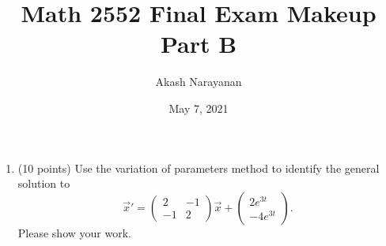 \documentclass[11pt, titlepage]{article}
\title{Math 2552 Final Exam Makeup Part B}
\author{Akash Narayanan}
\date{May 7, 2021}
\begin{document}
    \maketitle

    \begin{enumerate}
        \item (10 points) Use the variation of parameters method to identify the general solution to
        \[
        \vec{x}' =
        \begin{pmatrix}
            2 & -1 \\
            -1 & 2
        \end{pmatrix} \vec{x} +
        \begin{pmatrix}
            2e^{3t} \\
            -4e^{3t}
        \end{pmatrix}.
        \]
        Please show your work.


\end{enumerate}
\end{document}
